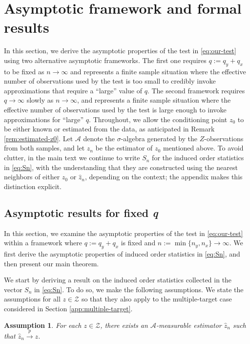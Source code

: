 \documentclass[11pt]{article}
\numberwithin{equation}{section}
\newtheorem{assumption}{Assumption}%
\begin{document}
\section{Asymptotic framework and formal results}\label{sec:results}

In this section, we derive the asymptotic properties of the test in \eqref{eq:our-test} using two alternative asymptotic frameworks. The first one requires $q := q_y+q_x$ to be fixed as $n\to \infty$ and represents a finite sample
situation where the effective number of observations used by the test is too small to credibly invoke approximations that require a ``large'' value of $q$. The second framework requires $q\to \infty$ slowly as $n\to \infty$, and represents a finite sample situation where the effective number of observations used by the test is large enough to invoke approximations for ``large'' $q$. Throughout, we allow the conditioning point $z_0$ to be either known or estimated from the data, as anticipated in Remark \ref{rem:estimated-z0}. Let $\mathcal A$ denote the $\sigma$-algebra generated by the $Z$-observations from both samples, and let $\hat z_n$ be the estimator of $z_0$ mentioned above. To avoid clutter, in the main text we continue to write $S_n$ for the induced order statistics in \eqref{eq:Sn}, with the understanding that they are constructed using the nearest neighbors of either $z_0$ or $\hat z_n$, depending on the context; the appendix makes this distinction explicit.

\subsection{Asymptotic results for fixed \emph{q}}\label{sec:fixed-q}

In this section, we examine the asymptotic properties of the test in \eqref{eq:our-test} within a framework where $q := q_y+q_x$ is fixed and $n:=\min\{n_y,n_x\}\to \infty$. We first derive the asymptotic properties of induced order statistics in \eqref{eq:Sn}, and then present our main theorem. 

We start by deriving a result on the induced order statistics collected in the vector $S_n$ in \eqref{eq:Sn}. To do so, we make the following assumptions. We state the assumptions for all $z\in\mathcal Z$ so that they also apply to the multiple-target case considered in Section \ref{app:multiple-target}.

\begin{assumption}\label{ass:zhat}
  For each $z\in\mathcal Z$, there exists an $\mathcal A$-measurable estimator $\hat z_n$ such that $\hat z_n \overset{p}{\to} z$.
  \end{assumption}
\end{document}
